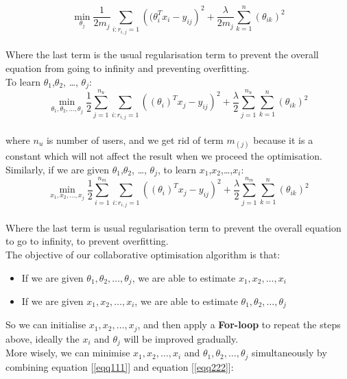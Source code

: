 \begin{equation*}
\min_{\theta_{j}} \frac{1}{2m_{j}}\sum_{i:r_{i,j} = 1}\left((\theta_{i}^{T}x_{i}-y_{ij}\right)^{2} + \frac{\lambda}{2m_{j}}\sum_{k = 1}^{n}(\theta_{ik})^{2}
\end{equation*}
\\Where the last term is the usual regularisation term to prevent the overall equation from going to infinity and preventing overfitting.
\\To learn $\theta_{1}$,$\theta_{2}$, \dots, $\theta_{j}$:
\begin{equation}
\label{eqq111}
\min_{\theta_{1},\theta_{2}, \dots, \theta_{j}} \frac{1}{2}\sum_{j = 1}^{n_{u}}\sum_{i:r_{i,j} = 1}\left((\theta_{i})^{T}x_{j}-y_{ij}\right)^{2} + \frac{\lambda}{2}\sum_{j = 1}^{n_{u}}\sum_{k = 1}^{n}(\theta_{ik})^{2}
\end{equation}
\\where $n_{u}$ is number of users, and we get rid of term $m_{(j)}$ because it is a constant which will not affect the result when we proceed the optimisation.
\\Similarly, if we are given $\theta_{1}$,$\theta_{2}$, \dots, $\theta_{j}$, to learn $x_{1}$,$x_{2}$,\dots,$x_{i}$:
\begin{equation}
\label{eqq222}
\min_{x_{1},x_{2}, \dots,x_{j}} \frac{1}{2}\sum_{i = 1}^{n_{m}}\sum_{i:r_{i,j} = 1}\left((\theta_{i})^{T}x_{j}-y_{ij}\right)^{2} + \frac{\lambda}{2}\sum_{j = 1}^{n_{m}}\sum_{k = 1}^{n}(\theta_{ik})^{2}
\end{equation}
\\Where the last term is usual regularisation term to prevent the overall equation to go to infinity, to prevent overfitting.
\\The objective of our collaborative optimisation algorithm is that:
\begin{itemize}
\item  If we are given $\theta_{1},\theta_{2}, \dots, \theta_{j}$, we are able to estimate $x_{1},x_{2}, \dots,x_{i}$
\item  If we are given $x_{1},x_{2}, \dots,x_{i}$, we are able to estimate $\theta_{1},\theta_{2}, \dots, \theta_{j}$
\end{itemize}
So we can initialise $x_{1},x_{2}, \dots,x_{j}$, and then apply a \textbf{For-loop} to repeat the steps above, ideally the $x_{i}$ and $\theta_{j}$ will be improved gradually. 
\\ More wisely, we can minimise $x_{1},x_{2}, \dots,x_{i}$ and $\theta_{1},\theta_{2}, \dots, \theta_{j}$ simultaneously by combining equation [\ref{eqq111}] and equation [\ref{eqq222}]:
